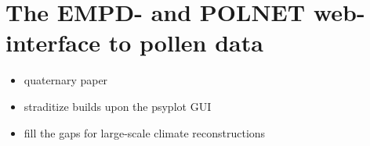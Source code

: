
\chapter{The EMPD- and POLNET web-interface to pollen data}

\label{chp:empd}



\begin{itemize}
	\item quaternary paper
	\item straditize builds upon the psyplot GUI
    \item fill the gaps for large-scale climate reconstructions
\end{itemize}
